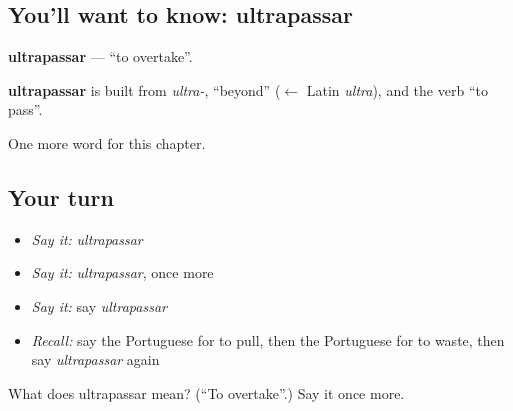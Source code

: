 \subsection*{You'll want to know: ultrapassar}
\textbf{ultrapassar} — \textquotedblleft{}to overtake\textquotedblright{}.

\begin{cousinweb}
\textbf{ultrapassar} is built from \emph{ultra-}, \textquotedblleft{}beyond\textquotedblright{} ($\leftarrow$ Latin \emph{ultra}), and the verb \textquotedblleft{}to pass\textquotedblright{}.
\end{cousinweb}

\begin{grammarlens}[title={What you've built}]
One more word for this chapter.
\end{grammarlens}

\subsection*{Your turn}
\begin{itemize}
\raggedright
  \item \emph{Say it:} \emph{ultrapassar}
  \item \emph{Say it:} \emph{ultrapassar}, once more
  \item \emph{Say it:} say \emph{ultrapassar}
  \item \emph{Recall:} say the Portuguese for to pull, then the Portuguese for to waste, then say \emph{ultrapassar} again
\end{itemize}

\begin{tcolorbox}[breakable,colback=teal!4,colframe=teal!35!black,title={Before you move on}]
What does ultrapassar mean? (\textquotedblleft{}To overtake\textquotedblright{}.) Say it once more.
\end{tcolorbox}
